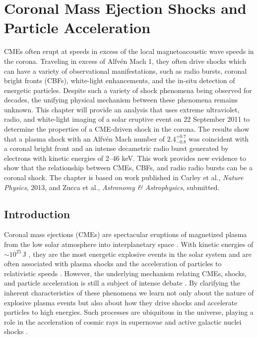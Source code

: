 \vspace{-5mm}
\singlespacing
\chapter{Coronal Mass Ejection Shocks and Particle Acceleration} 
\label{chap:5}
\doublespacing
\vspace{-10mm}
CMEs often erupt at speeds in excess of the local magnetoacoustic wave speeds in the corona. Traveling in excess of Alfv\'{e}n Mach 1, they often drive shocks which can have a variety of observational manifestations, such as radio bursts, coronal bright fronts (CBFs), white-light enhancements, and the in-situ detection of energetic particles. Despite such a variety of shock phenomena being observed for decades, the unifying physical mechanism between these phenomena remains unknown. This chapter will provide an analysis that uses extreme ultraviolet, radio, and white-light imaging of a solar eruptive event on 22 September 2011 to determine the properties of a CME-driven shock in the corona. The results show that a plasma shock with an Alfv\'{e}n Mach number of $2.4^{+0.7}_{-0.8}$ was coincident with a coronal bright front and an intense decametric radio burst generated by electrons with kinetic energies of 2--46 keV. This work provides new evidence to show that the relationship between CMEs, CBFs, and radio radio bursts can be a coronal shock. The chapter is based on work published in Carley et al., {\it Nature Physics}, 2013, and Zucca et al., {\it Astronomy \& Astrophysics}, submitted.

\doublespacing
\section{Introduction}\label{sec:1}
Coronal mass ejections (CMEs) are spectacular eruptions of magnetized plasma from the low solar atmosphere into interplanetary space \citep{byrne2010, roussev2012}. With kinetic energies of $\sim$$10^{25}$\,J \citep{vourlidas2010}, they are the most energetic explosive events in the solar system and are often associated with plasma shocks and the acceleration of particles to relativistic speeds \citep{klassen2002, grechnev2011}. However, the underlying mechanism relating CMEs, shocks, and particle acceleration is still a subject of intense debate \citep{vrsnak2008}. By clarifying the inherent characteristics of these phenomena we learn not only about the nature of explosive plasma events but also about how they drive shocks and accelerate particles to high energies. Such processes are ubiquitous in the universe, playing a role in the acceleration of cosmic rays in supernovae and active galactic nuclei shocks \citep{drury2012}.


